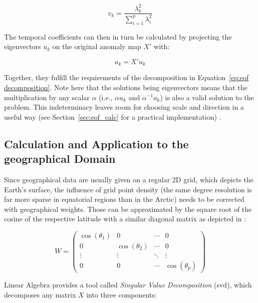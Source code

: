 \begin{equation}
  v_k = \frac{\lambda^2_k}{\sum^{p}_{i=1} \lambda^2_i}
  \label{eq:eof variance calculation}
\end{equation}

The temporal coefficients can then in turn be calculated by projecting the eigenvectors $u_k$ on the original anomaly map $X'$ with: 

\begin{equation}
  a_{k} = X'u_k
\end{equation}

Together, they fulfill the requirements of the decomposition in Equation~\ref{eq:eof decomposition}. 
Note here that the solutions being eigenvectors means that the multiplication by any scalar $\alpha$ (i.e., $\alpha u_k$ and $\alpha^{-1} a_k$) is also a valid solution to the problem. 
This indeterminacy leaves room for choosing scale and direction in a useful way (see Section~\ref{sec:eof_calc} for a practical implementation) \cite{vietinghoffdiss}. 

\subsection{Calculation and Application to the geographical Domain}


Since geographical data are usually given on a regular 2D grid, which depicts the Earth's surface, the influence of grid point density (the same degree resolution is far more sparse in equatorial regions than in the Arctic) needs to be corrected with geographical weights. 
Those can be approximated by the square root of the cosine of the respective latitude \cite{hannachi_primer_nodate, vietinghoffdiss} with a similar diagonal matrix as depicted in \cite{hannachi_primer_nodate}: 

\begin{equation}
  W = \begin{pmatrix}
    \cos(\theta_1) & 0 & \cdots & 0 \\
0 & \cos(\theta_2) & \cdots & 0 \\
\vdots & \vdots & \ddots & \vdots \\
0 & 0 & \cdots & \cos(\theta_p)
\end{pmatrix}
  \label{eq:geographical weighting}
\end{equation}
  

Linear Algebra provides a tool called \textit{Singular Value Decomposition} (\ac{svd}), which decomposes any matrix $X$ into three components: 


